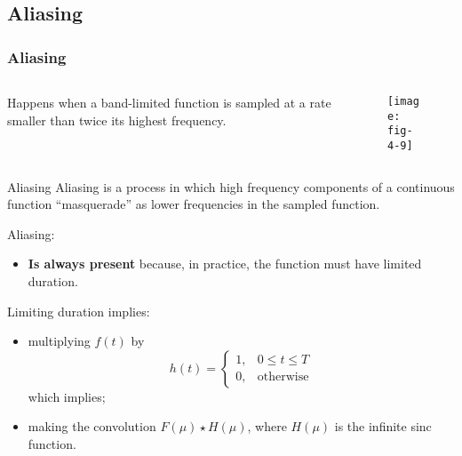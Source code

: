 
\subsection{Aliasing}


\begin{frame}
\frametitle{Aliasing}
\begin{columns}
\begin{column}{.3\textwidth}
Happens when a band-limited function is sampled at a rate smaller than twice its highest frequency.
\end{column}
\begin{column}{.7\textwidth}
\begin{figure}
\centering
\texttt{[image: fig-4-9]}
\end{figure}
\end{column}
\end{columns}
\end{frame}


\begin{frame}
\begin{block}{Aliasing}
Aliasing is a process in which
high frequency components of a continuous function ``masquerade'' as lower frequencies in the sampled function.
\end{block}
\end{frame}


\begin{frame}
Aliasing:
\begin{itemize}
\item \textbf{Is always present} because, in practice, the function must have limited duration.
\end{itemize}
Limiting duration implies:
\begin{itemize}
\item multiplying $f(t)$ by
\[
h(t) = \left \{
\begin{array}{ll}
1, & 0\leq t \leq T \\
0, & \text{otherwise}
\end{array}
\right .
\]
which implies;
\item making the convolution $F(\mu)\star H(\mu)$, where $H(\mu)$ is the infinite sinc function.
\end{itemize}
\end{frame}

